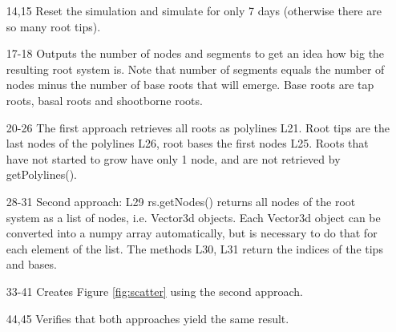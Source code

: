 \begin{itemize}

\item[14,15] Reset the simulation and simulate for only 7 days (otherwise there are so many root tips).

\item[17-18] Outputs the number of nodes and segments to get an idea how big the resulting root system is. 
Note that number of segments equals the number of nodes minus the number of base roots that will emerge. 
Base roots are tap roots, basal roots and shootborne roots.

\item[20-26] The first approach retrieves all roots as polylines L21. 
Root tips are the last nodes of the polylines L26, root bases the first nodes L25. Roots that have not started to grow have only 1 node, and are not retrieved by getPolylines().

\item[28-31] Second approach: L29 rs.getNodes() returns all nodes of the root system as a list of nodes, i.e. Vector3d objects. Each Vector3d object can be converted into a numpy array automatically, but is necessary to do that for each element of the list. The methods L30, L31 return the indices of the tips and bases. 

\item[33-41] Creates Figure \ref{fig:scatter} using the second approach.

\item[44,45] Verifies that both approaches yield the same result.

\end{itemize}


